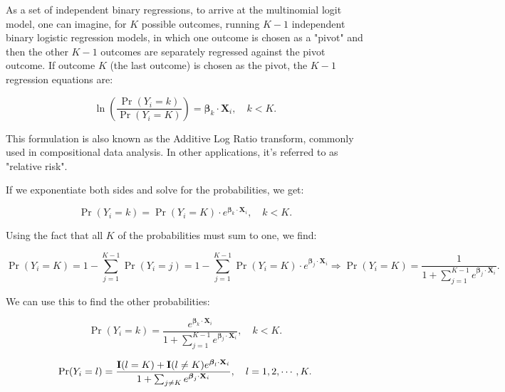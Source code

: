 \documentclass[UTF8,a4paper,10pt]{article}
\begin{document}
\begin{mybox}{}

As a set of independent binary regressions, to arrive at the multinomial logit model, one can imagine, for $K$ possible outcomes, running $K-1$ independent binary logistic regression models, in which one outcome is chosen as a "pivot" and then the other $K-1$ outcomes are separately regressed against the pivot outcome. If outcome $K$ (the last outcome) is chosen as the pivot, the $K-1$ regression equations are:

\begin{equation*}
\ln\left(\frac{\Pr(Y_i=k)}{\Pr(Y_i=K)}\right) = \boldsymbol{\beta}_k \cdot \mathbf{X}_i, \quad k < K.
\end{equation*}

This formulation is also known as the Additive Log Ratio transform, commonly used in compositional data analysis. In other applications, it's referred to as "relative risk".

If we exponentiate both sides and solve for the probabilities, we get:

\begin{equation*}
\Pr(Y_i=k) = \Pr(Y_i=K) \cdot e^{\boldsymbol{\beta}_k \cdot \mathbf{X}_i}, \quad k < K.
\end{equation*}

Using the fact that all $K$ of the probabilities must sum to one, we find:

\begin{equation*}
\Pr(Y_i=K) = 1 - \sum_{j=1}^{K-1} \Pr(Y_i=j) = 1 - \sum_{j=1}^{K-1} \Pr(Y_i=K) \cdot e^{\boldsymbol{\beta}_j \cdot \mathbf{X}_i} \Rightarrow \Pr(Y_i=K) = \frac{1}{1 + \sum_{j=1}^{K-1} e^{\boldsymbol{\beta}_j \cdot \mathbf{X}_i}}.
\end{equation*}

We can use this to find the other probabilities:

\begin{equation*}
\Pr(Y_i=k) = \frac{e^{\boldsymbol{\beta}_k \cdot \mathbf{X}_i}}{1 + \sum_{j=1}^{K-1} e^{\boldsymbol{\beta}_j \cdot \mathbf{X}_i}}, \quad k < K.
\end{equation*}

\begin{equation*}
  \Pr(Y_i=l) = \frac{\operatorname{\mathbf{I}}(l = K)+\operatorname{\mathbf{I}}(l\neq K)e^{\boldsymbol{\beta}_l \cdot \mathbf{X}_i}}{1 + \sum_{j\neq K} e^{\boldsymbol{\beta}_j \cdot \mathbf{X}_i}}, \quad l = 1,2,\cdots,K.
  \end{equation*}

\end{mybox}
\end{document}
